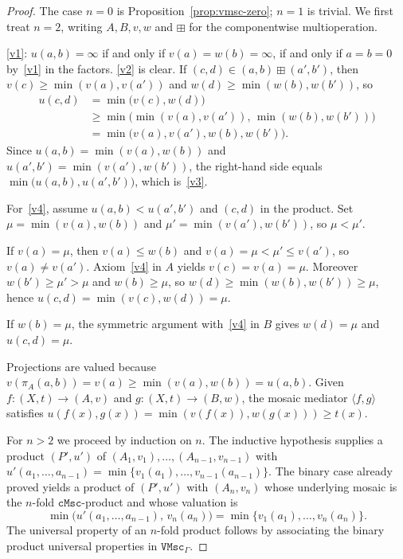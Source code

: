 \documentclass[11pt]{amsart}
\theoremstyle{plain}
\theoremstyle{definition}
\theoremstyle{remark}
\newcommand{\cMsc}{\mathtt{cMsc}}
\newcommand{\VMscG}{\mathtt{VMsc}_{\Gamma}}
\begin{document}
\begin{proof}
The case \(n=0\) is Proposition~\ref{prop:vmsc-zero}; \(n=1\) is trivial. We first treat \(n=2\), writing \(A,B,v,w\) and \(\boxplus\) for the componentwise multioperation.

\eqref{v1}: \(u(a,b)=\infty\) if and only if \(v(a)=w(b)=\infty\), if and only if \(a=b=0\) by~\eqref{v1} in the factors. \eqref{v2} is clear. If \((c,d)\in(a,b)\boxplus(a',b')\), then \(v(c)\ge\min(v(a),v(a'))\) and \(w(d)\ge\min(w(b),w(b'))\), so
\begin{align*}
u(c,d)
&=\min\bigl(v(c),w(d)\bigr)\\
&\ge\min\bigl(\min(v(a),v(a')),\,\min(w(b),w(b'))\bigr)\\
&=\min\bigl(v(a),v(a'),w(b),w(b')\bigr).
\end{align*}
Since \(u(a,b)=\min(v(a),w(b))\) and \(u(a',b')=\min(v(a'),w(b'))\), the right-hand side equals \(\min\bigl(u(a,b),u(a',b')\bigr)\), which is~\eqref{v3}.

For~\eqref{v4}, assume \(u(a,b)<u(a',b')\) and \((c,d)\) in the product. Set \(\mu=\min(v(a),w(b))\) and \(\mu'=\min(v(a'),w(b'))\), so \(\mu<\mu'\).

If \(v(a)=\mu\), then \(v(a)\le w(b)\) and \(v(a)=\mu<\mu'\le v(a')\), so \(v(a)\neq v(a')\). Axiom~\eqref{v4} in \(A\) yields \(v(c)=v(a)=\mu\). Moreover \(w(b')\ge\mu'>\mu\) and \(w(b)\ge\mu\), so \(w(d)\ge\min(w(b),w(b'))\ge\mu\), hence \(u(c,d)=\min(v(c),w(d))=\mu\).

If \(w(b)=\mu\), the symmetric argument with~\eqref{v4} in \(B\) gives \(w(d)=\mu\) and \(u(c,d)=\mu\).

Projections are valued because \(v(\pi_A(a,b))=v(a)\ge\min(v(a),w(b))=u(a,b)\). Given \(f\colon(X,t)\to(A,v)\) and \(g\colon(X,t)\to(B,w)\), the mosaic mediator \(\langle f,g\rangle\) satisfies \(u(f(x),g(x))=\min(v(f(x)),w(g(x)))\ge t(x)\).

For \(n>2\) we proceed by induction on \(n\). The inductive hypothesis supplies a product
\((P',u')\) of \((A_1,v_1),\ldots,(A_{n-1},v_{n-1})\) with
\(u'(a_1,\ldots,a_{n-1})=\min\{v_1(a_1),\ldots,v_{n-1}(a_{n-1})\}\).
The binary case already proved yields a product of \((P',u')\) with \((A_n,v_n)\) whose underlying mosaic is the \(n\)-fold \(\cMsc\)-product and whose valuation is
\[
\min\bigl(u'(a_1,\ldots,a_{n-1}),\,v_n(a_n)\bigr)
=\min\{v_1(a_1),\ldots,v_n(a_n)\}.
\]
The universal property of an \(n\)-fold product follows by associating the binary product universal properties in \(\VMscG\).
\end{proof}
\end{document}
